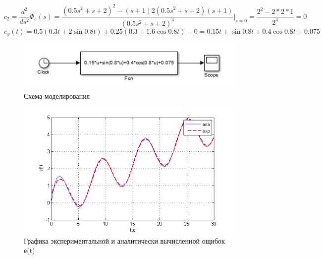 \documentclass[a4paper, 11pt]{article}
\begin{document}
\[{c_2} = \frac{{{d^2}}}{{d{s^2}}}{\Phi _e}(s) = \frac{{{{(0.5{s^2} + s + 2)}^2} - (s + 1)2(0.5{s^2} + s + 2)(s + 1)}}{{{{(0.5{s^2} + s + 2)}^4}}}{|_{s = 0}} = \frac{{{2^2} - 2*2*1}}{{{2^4}}} = 0\]
\[{e_y}(t) = 0.5(0.3t + 2\sin 0.8t) + 0.25(0.3 + 1.6\cos 0.8t) - 0 = 0.15t + \sin 0.8t + 0.4\cos 0.8t + 0.075\]
\newpage
\begin{figure}[h]
	\centering
	\includegraphics[width=0.7\linewidth]{16}
	\caption{Схема моделирования}
	\label{fig:16}
\end{figure}

\begin{center}
	\begin{figure}[ht]
		\centering
			\includegraphics[width=0.7\linewidth]{17}
		\caption{Графика экспериментальной и аналитически вычисленной ощибок е(t)}
		\label{fig:17}
	\end{figure}
\end{center}
\newpage
\end{document}
